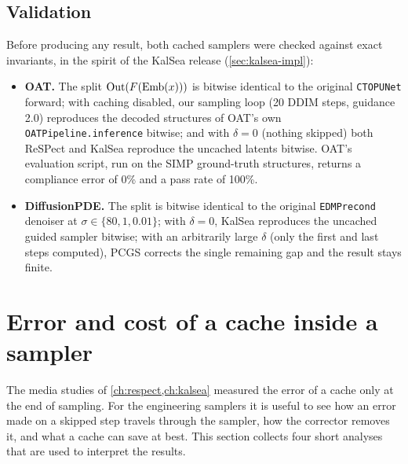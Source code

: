 \subsection{Validation}\label{sec:app-validation}
Before producing any result, both cached samplers were checked against exact invariants, in the spirit of the KalSea release (\cref{sec:kalsea-impl}):
\begin{itemize}
  \item \textbf{OAT.} The split $\mathrm{Out}(F(\mathrm{Emb}(x)))$ is bitwise identical to the original \texttt{CTOPUNet} forward; with caching disabled, our sampling loop (20 DDIM steps, guidance 2.0) reproduces the decoded structures of OAT's own \texttt{OATPipeline.inference} bitwise; and with $\delta=0$ (nothing skipped) both ReSPect and KalSea reproduce the uncached latents bitwise. OAT's evaluation script, run on the SIMP ground-truth structures, returns a compliance error of 0\% and a pass rate of 100\%.
  \item \textbf{DiffusionPDE.} The split is bitwise identical to the original \texttt{EDMPrecond} denoiser at $\sigma\in\{80,1,0.01\}$; with $\delta=0$, KalSea reproduces the uncached guided sampler bitwise; with an arbitrarily large $\delta$ (only the first and last steps computed), PCGS corrects the single remaining gap and the result stays finite.
\end{itemize}

\section{Error and cost of a cache inside a sampler}\label{sec:app-theory}

The media studies of \cref{ch:respect,ch:kalsea} measured the error of a cache only at the end of sampling. For the engineering samplers it is useful to see how an error made on a skipped step travels through the sampler, how the corrector removes it, and what a cache can save at best. This section collects four short analyses that are used to interpret the results.

